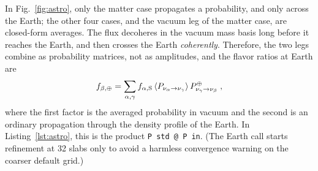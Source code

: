 \documentclass[final,5p,times,twocolumn,sort,compress]{elsarticle}
\makeatletter
\newcommand{\fig}{Fig.}
\DeclareRobustCommand{\_}{%
  \ifmmode\nfss@text{\textunderscore}\else\textunderscore\allowbreak\fi}
\newcommand{\figu}[1]{\fig~\ref{fig:#1}}
\makeatother
\begin{document}
In \figu{astro}, only the matter case propagates a probability, and only across the Earth; the other four cases, and the vacuum leg of the matter case, are closed-form averages. The flux decoheres in the vacuum mass basis long before it reaches the Earth, and then crosses the Earth \emph{coherently}. Therefore, the two legs combine as probability matrices, not as amplitudes, and the flavor ratios at Earth are
\begin{equation}
 \label{equ:astro_earth_leg}
 f_{\beta,\oplus}
 =
 \sum_{\alpha,\gamma} f_{\alpha, {\rm S}}\,
 \langle P_{\nu_\alpha \to \nu_\gamma}\rangle\,
 P^{\oplus}_{\nu_\gamma \to \nu_\beta} \;,
\end{equation}
where the first factor is the averaged probability in vacuum and the second is an ordinary propagation through the density profile of the Earth. In Listing~\ref{lst:astro}, this is the product {\tt P\_std @ P\_in}. (The Earth call starts refinement at 32 slabs only to avoid a harmless convergence warning on the coarser default grid.)

\smallskip
\end{document}
